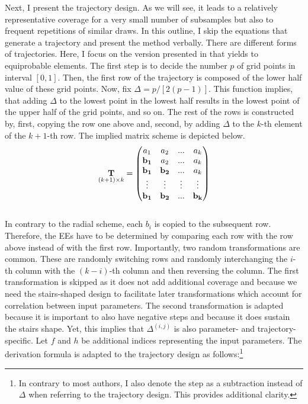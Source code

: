\documentclass[a4paper,12pt]{article}
\begin{document}
\noindent
Next, I present the trajectory design. As we will see, it leads to a relatively representative coverage for a very small number of subsamples but also to frequent repetitions of similar draws.
In this outline, I skip the equations that generate a trajectory and present the method verbally.
There are different forms of trajectories. Here, I focus on the version presented in \cite{Morris.1991} that yields to equiprobable elements. The first step is to decide the number $p$ of grid points in interval $[0,1]$. Then, the first row of the trajectory is composed of the lower half value of these grid points. Now, fix $\Delta = p/[2(p-1)]$. This function implies, that adding $\Delta$ to the lowest point in the lowest half results in the lowest point of the upper half of the grid points, and so on. The rest of the rows is constructed by, first, copying the row one above and, second, by adding $\Delta$ to the $k$-th element of the $k+1$-th row. The implied matrix scheme is depicted below.
\begin{align}
\underset{(k+1)\times k}{\bold{T}} =
\begin{pmatrix}
a_1 & a_2 & ... & a_k \\
\bold{b_1} & a_2 & ... & a_k \\
\bold{b_1} & \bold{b_2} & ... & a_k \\
\vdots & \vdots & \vdots & \vdots\\
\bold{b_1} & \bold{b_2} & ... & \bold{b_k}
\end{pmatrix}
\end{align}
\\

\noindent
In contrary to the radial scheme, each $b_i$ is copied to the subsequent row. Therefore, the EEs have to be determined by comparing each row with the row above instead of with the first row.
Importantly, two random transformations are common. These are randomly switching rows and randomly interchanging the $i$-th column with the $(k-i)$-th column and then reversing the column. The first transformation is skipped as it does not add additional coverage and because we need the stairs-shaped design to facilitate later transformations which account for correlation between input parameters. The second transformation is adapted because it is important to also have negative steps and because it does sustain the stairs shape. Yet, this implies that $\Delta^{(i,j)}$ is also parameter- and trajectory-specific. Let $f$ and $h$ be additional indices representing the input parameters. The derivation formula is adapted to the trajectory design as follows:\footnote{In contrary to most authors, I also denote the step as a subtraction instead of $\Delta$ when referring to the trajectory design. This provides additional clarity.}
\end{document}
